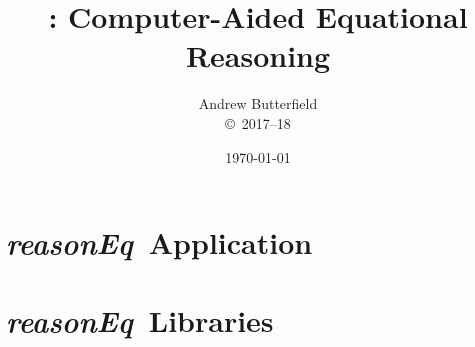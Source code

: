 \documentclass[fleqn,10pt]{report}
\author{
Andrew Butterfield
\\
{\small \copyright\ 2017--18}
}
\title{
  \reasonEq: Computer-Aided Equational Reasoning
}
\date{
\today
}
\def\reasonEq{\textit{\textsf{reasonEq}}}
\begin{document}
\maketitle
\tableofcontents

\chapter{\reasonEq\ Application}



\chapter{\reasonEq\ Libraries}

% 
% 
% 
% 
% 
% 
% 
% 
% 
\newpage

% 
\newpage

% 
% 
% 


%
% 
%
%
% 
\newpage

\newpage

%
% 
% 
%
%
%
% 
\end{document}
